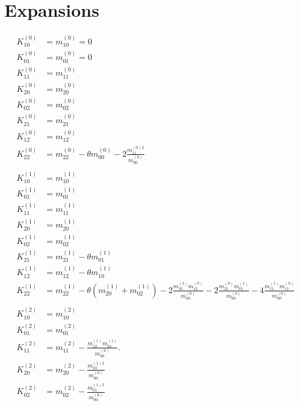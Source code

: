 \documentclass{article}
\begin{document}
  \section{Expansions}
  \begin{align}
    K_{10}^{(0)} & = m_{10}^{(0)}=0 \tag{E1}
    \\
    K_{01}^{(0)} & = m_{01}^{(0)}=0 \tag{E2}
    \\
    K_{11}^{(0)} & = m_{11}^{(0)} \tag{E3}
    \\
    K_{20}^{(0)} & = m_{20}^{(0)} \tag{E4}
    \\
    K_{02}^{(0)} & = m_{02}^{(0)} \tag{E5}
    \\
    K_{21}^{(0)} & = m_{21}^{(0)} \tag{E6}
    \\
    K_{12}^{(0)} & = m_{12}^{(0)} \tag{E7}
    \\
    K_{22}^{(0)} & = m_{22}^{(0)} - \theta m_{00}^{(0)} - 2\frac{ m_{11}^{(0)2}}{m_{00}^{(0)}}\tag{E8}
  \\\nonumber&\\
    K_{10}^{(1)} & = m_{10}^{(1)} \tag{E9}
    \\
    K_{01}^{(1)} & = m_{01}^{(1)} \tag{E10}
    \\
    K_{11}^{(1)} & = m_{11}^{(1)} \tag{E11}
    \\
    K_{20}^{(1)} & = m_{20}^{(1)} \tag{E12}
    \\
    K_{02}^{(1)} & = m_{02}^{(1)} \tag{E13}
    \\
    K_{21}^{(1)} & = m_{21}^{(1)} - \theta m_{01}^{(1)} \tag{E14}
    \\
    K_{12}^{(1)} & = m_{12}^{(1)} - \theta m_{10}^{(1)} \tag{E15}
    \\
    K_{22}^{(1)} & = m_{22}^{(1)}\tag{E16}
      - \theta (m_{20}^{(1)} + m_{02}^{(1)})
      - 2\frac{ m_{10}^{(1)} m_{12}^{(0)} }{m_{00}^{(0)}}
      - 2\frac{ m_{21}^{(0)} m_{01}^{(1)} }{m_{00}^{(0)}}
      - 4\frac{ m_{11}^{(1)} m_{11}^{(0)} }{m_{00}^{(0)}}
    \\\nonumber&\\
    K_{10}^{(2)} & = m_{10}^{(2)}\tag{E17}
    \\
    K_{01}^{(2)} & = m_{01}^{(2)}\tag{E18}
    \\
    K_{11}^{(2)} & = m_{11}^{(2)} - \frac{ m_{10}^{(1)}m_{01}^{(1)}}{m_{00}^{(0)}}. \tag{E19}
    \\
    K_{20}^{(2)} & = m_{20}^{(2)} - \frac{ m_{10}^{(1)2}}{m_{00}^{(0)}} \tag{E20}
    \\
    K_{02}^{(2)} & = m_{02}^{(2)} - \frac{ m_{01}^{(1)2}}{m_{00}^{(0)}}\tag{E21}
  \end{align}
\end{document}
